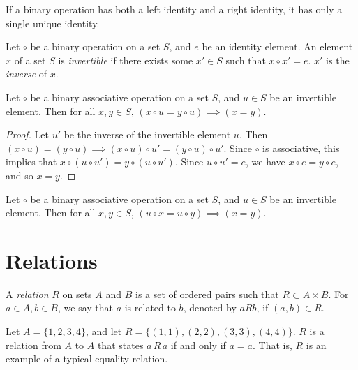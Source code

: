 \begin{cor}
    If a binary operation has both a left identity and a right identity, it has only a single unique identity.
\end{cor}

\begin{defn}
    Let $\circ$ be a binary operation on a set $S$, and $e$ be an identity element. An element $x$ of a set $S$ is \emph{invertible} if there exists some $x' \in S$ such that $x \circ x' = e$. $x'$ is the \emph{inverse} of $x$.
\end{defn}

\begin{thm}
    Let $\circ$ be a binary associative operation on a set $S$, and $u \in S$ be an invertible element. Then for all $x, y \in S$, $(x \circ u = y \circ u) \implies (x = y)$.
\end{thm}

\begin{proof}
    Let $u'$ be the inverse of the invertible element $u$. Then $(x \circ u) = (y \circ u) \implies (x \circ u) \circ u' = (y \circ u) \circ u'$. Since $\circ$ is associative, this implies that $x \circ (u \circ u') = y \circ (u \circ u')$. Since $u \circ u' = e$, we have $x \circ e = y \circ e$, and so $x = y$.
\end{proof}

\begin{cor}
    Let $\circ$ be a binary associative operation on a set $S$, and $u \in S$ be an invertible element. Then for all $x, y \in S$, $(u \circ x = u \circ y) \implies (x = y)$.
\end{cor}

\section{Relations}

\begin{defn}
    A \emph{relation} $R$ on sets $A$ and $B$ is a set of ordered pairs such that $R \subset A \times B$. For $a \in A, b \in B$, we say that $a$ is related to $b$, denoted by $a R b$, if $(a, b) \in R$.
\end{defn}

\begin{exmp}
    Let $A = \{1, 2, 3, 4\}$, and let $R = \{(1, 1), (2, 2), (3, 3), (4, 4)\}$. $R$ is a relation from $A$ to $A$ that states $a \,R\, a$ if and only if $a = a$. That is, $R$ is an example of a typical equality relation.
\end{exmp}

